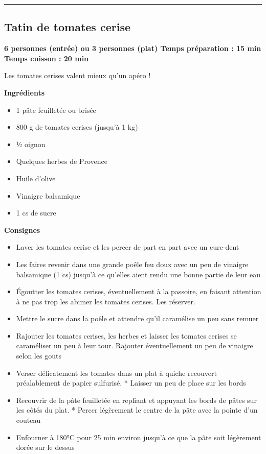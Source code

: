 \documentclass[]{book}
\providecommand{\tightlist}{%
  \setlength{\itemsep}{0pt}\setlength{\parskip}{0pt}}
\begin{document}
\begin{center}\rule{0.5\linewidth}{0.5pt}\end{center}

\subsection*{\texorpdfstring{{Tatin de tomates
cerise}}{Tatin de tomates cerise}}\label{tatin-de-tomates-cerise}

\begin{salebox}
\textbf{6 personnes (entrée) ou 3 personnes (plat) \textbar{} Temps
préparation : 15 min \textbar{} Temps cuisson : 20 min}

Les tomates cerises valent mieux qu'un apéro !
\end{salebox}

 \textbf{Ingrédients}

\begin{itemize}
\tightlist
\item
  1 pâte feuilletée ou brisée
\item
  800 g de tomates cerises (jusqu'à 1 kg)
\item
  ½ oignon
\item
  Quelques herbes de Provence
\item
  Huile d'olive
\item
  Vinaigre balsamique
\item
  1 cs de sucre
\end{itemize}

\textbf{Consignes}

\begin{itemize}
\tightlist
\item
  Laver les tomates cerise et les percer de part en part avec un
  cure-dent
\item
  Les faires revenir dans une grande poêle feu doux avec un peu de
  vinaigre balsamique (1 cs) jusqu'à ce qu'elles aient rendu une bonne
  partie de leur eau
\item
  Égoutter les tomates cerises, éventuellement à la passoire, en faisant
  attention à ne pas trop les abimer les tomates cerises. Les réserver.
\item
  Mettre le sucre dans la poêle et attendre qu'il caramélise un peu sans
  remuer
\item
  Rajouter les tomates cerises, les herbes et laisser les tomates
  cerises se caraméliser un peu à leur tour. Rajouter éventuellement un
  peu de vinaigre selon les gouts
\item
  Verser délicatement les tomates dans un plat à quiche recouvert
  préalablement de papier sulfurisé. * Laisser un peu de place sur les
  bords
\item
  Recouvrir de la pâte feuilletée en repliant et appuyant les bords de
  pâtes sur les côtés du plat. * Percer légèrement le centre de la pâte
  avec la pointe d'un couteau
\item
  Enfourner à 180°C pour 25 min environ jusqu'à ce que la pâte soit
  légèrement dorée sur le dessus
\end{itemize}
\end{document}
